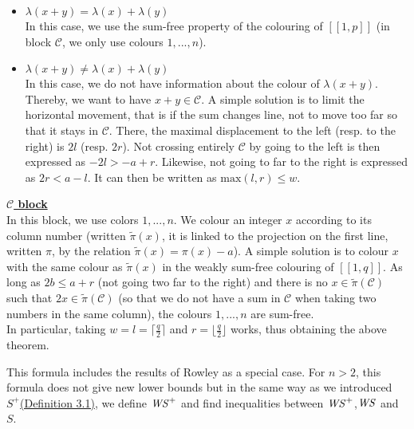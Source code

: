 \begin{itemize}
	\item \underline{\(\lambda(x+y) = \lambda(x) + \lambda(y)\)} \\
	In this case, we use the sum-free property of the colouring of \([\![1,p]\!]\) (in block \(\mathcal{C}\), we only use colours \(1, ..., n\)).

	\item \underline{\(\lambda(x+y) \neq \lambda(x) + \lambda(y)\)} \\
	In this case, we do not have information about the colour of \(\lambda(x+y)\). Thereby, we want to have \(x+y \in \mathcal{C}\).
	A simple solution is to limit the horizontal movement, that is if the sum changes line, not to move too far so that it stays in \(\mathcal{C}\).
	There, the maximal displacement to the left (resp. to the right) is \(2l\) (resp. \(2r\)). Not crossing entirely \(\mathcal{C}\) by going to the left
	is then expressed as \(-2l > -a + r\). Likewise, not going to far to the right is expressed as \(2r < a - l\). It can then be written as
	 \(\text{max}(l, r) \leqslant w\).
\end{itemize}

\underline{\textbf{\(\mathcal{C}\) block}} \\
In this block,  we use colors \(1, ..., n\). We colour an integer \(x\) according to its column number (written \(\tilde{\pi}(x)\), it is linked to the
projection on the first line, written \(\pi\), by the relation \(\tilde{\pi}(x) = \pi(x) - a\)). A simple solution is to colour \(x\) with the same colour
as \(\tilde{\pi}(x)\) in the weakly sum-free colouring of \([\![1,q]\!]\). As long as \(2b \leqslant a + r\) (not going two far to the right) and there
is no \(x \in \tilde{\pi}(\mathcal{C})\) such that \(2x \in \tilde{\pi}(\mathcal{C})\) (so that we do not have a sum in \(\mathcal{C}\) when
taking two numbers in the same column), the colours \(1, ..., n\) are sum-free. \\

In particular, taking \(w = l = \lceil \frac{q}{2} \rceil\) and \(r = \lfloor \frac{q}{2} \rfloor\) works, thus obtaining the above theorem.

\begin{remark}
This formula includes the results of Rowley \cite{RowleyWS} as a special case. For \(n>2\),
this formula does not give new lower bounds but in the same way as we introduced \(S^+\)\hyperref[SE]{(Definition
3.1)}, we define \(\mathit{WS}^+\) and find inequalities between \(\mathit{WS}^+\),\(\mathit{WS}\) and \(S\).
\end{remark}

